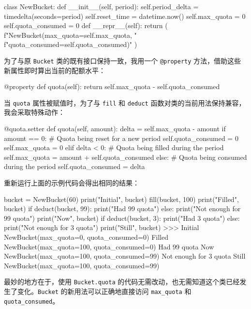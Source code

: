 \begin{codebox}[python]
class NewBucket:
    def __init__(self, period):
        self.period_delta = timedelta(seconds=period)
        self.reset_time = datetime.now()
        self.max_quota = 0
        self.quota_consumed = 0
    def __repr__(self):
        return (
            f"NewBucket(max_quota={self.max_quota}, "
            f"quota_consumed={self.quota_consumed})"
        )
\end{codebox}

为了与原 \texttt{Bucket} 类的既有接口保持一致，我用一个 \texttt{@property} 方法，借助这些新属性即时算出当前的配额水平：

\begin{codebox}[python]
    @property
    def quota(self):
        return self.max_quota - self.quota_consumed
\end{codebox}

当 \texttt{quota} 属性被赋值时，为了与 \texttt{fill} 和 \texttt{deduct} 函数对类的当前用法保持兼容，我会采取特殊动作：

\begin{codebox}[python]
    @quota.setter
    def quota(self, amount):
        delta = self.max_quota - amount
        if amount == 0:
            # Quota being reset for a new period
            self.quota_consumed = 0
            self.max_quota = 0
        elif delta < 0:
            # Quota being filled during the period
            self.max_quota = amount + self.quota_consumed
        else:
            # Quota being consumed during the period
            self.quota_consumed = delta
\end{codebox}

重新运行上面的示例代码会得出相同的结果：

\begin{codebox}[python]
bucket = NewBucket(60)
print("Initial", bucket)
fill(bucket, 100)
print("Filled", bucket)
if deduct(bucket, 99):
    print("Had 99 quota")
else:
    print("Not enough for 99 quota")
print("Now", bucket)
if deduct(bucket, 3):
    print("Had 3 quota")
else:
    print("Not enough for 3 quota")
print("Still", bucket)
>>>
Initial NewBucket(max_quota=0, quota_consumed=0)
Filled NewBucket(max_quota=100, quota_consumed=0)
Had 99 quota
Now NewBucket(max_quota=100, quota_consumed=99)
Not enough for 3 quota
Still NewBucket(max_quota=100, quota_consumed=99)
\end{codebox}

最妙的地方在于，使用 \texttt{Bucket.quota} 的代码无需改动，也无需知道这个类已经发生了变化。\texttt{Bucket} 的新用法可以正确地直接访问 \texttt{max\_quota} 和 \texttt{quota\_consumed}。

